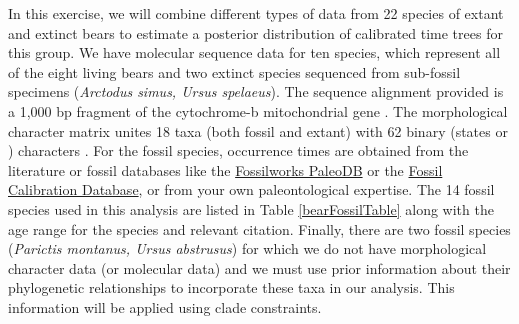 In this exercise, we will combine different types of data from 22 species of extant and extinct bears to estimate a posterior distribution of calibrated time trees for this group.
We have molecular sequence data for ten species, which represent all of the eight living bears and two extinct species sequenced from sub-fossil specimens (\textit{Arctodus simus, Ursus spelaeus}).
The sequence alignment provided is a 1,000 bp fragment of the cytochrome-b mitochondrial gene \citep{krause2008}.
The morphological character matrix unites 18 taxa (both fossil and extant) with 62 binary (states  or ) characters \citep{abella12}.
For the fossil species, occurrence times are obtained from the literature or fossil databases like the \href{http://fossilworks.org/}{Fossilworks PaleoDB} or the \href{http://fossilcalibrations.org/}{Fossil Calibration Database}, or from your own paleontological expertise. 
The 14 fossil species used in this analysis are listed in Table \ref{bearFossilTable} along with the age range for the species and relevant citation.
Finally, there are two fossil species (\textit{Parictis montanus, Ursus abstrusus}) for which we do not have morphological character data (or molecular data) and we must use prior information about their phylogenetic relationships to incorporate these taxa in our analysis. 
This information will be applied using clade constraints.

